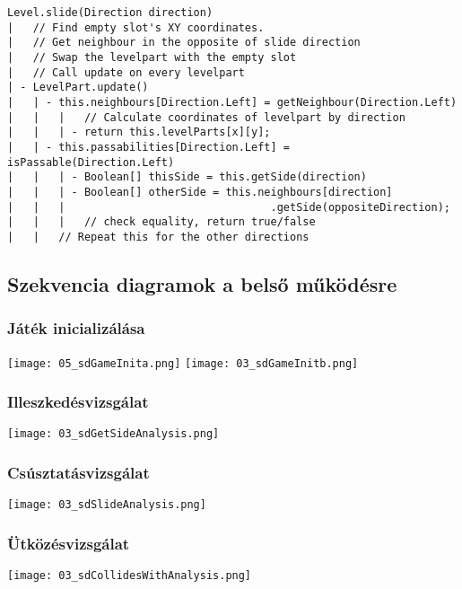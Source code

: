 \begin{verbatim}
Level.slide(Direction direction)
|   // Find empty slot's XY coordinates.
|   // Get neighbour in the opposite of slide direction
|   // Swap the levelpart with the empty slot
|   // Call update on every levelpart
| - LevelPart.update()
|   | - this.neighbours[Direction.Left] = getNeighbour(Direction.Left)
|   |   |   // Calculate coordinates of levelpart by direction
|   |   | - return this.levelParts[x][y];
|   | - this.passabilities[Direction.Left] = isPassable(Direction.Left)
|   |   | - Boolean[] thisSide = this.getSide(direction)
|   |   | - Boolean[] otherSide = this.neighbours[direction]
|   |   |                                .getSide(oppositeDirection);
|   |   |   // check equality, return true/false
|   |   // Repeat this for the other directions
\end{verbatim}

\subsection{Szekvencia diagramok a belső működésre}
	\subsubsection{Játék inicializálása}
		\begin{center}
		\texttt{[image: 05\_sdGameInita.png]}
		\newpage
		\texttt{[image: 03\_sdGameInitb.png]}
		\newpage
		\end{center}
	\subsubsection{Illeszkedésvizsgálat}
		\begin{center}
		\texttt{[image: 03\_sdGetSideAnalysis.png]}
		\newpage
		\end{center}
	\subsubsection{Csúsztatásvizsgálat}
		\begin{center}
		\texttt{[image: 03\_sdSlideAnalysis.png]}
		\newpage
		\end{center}
	\subsubsection{Ütközésvizsgálat}
		\begin{center}
		\texttt{[image: 03\_sdCollidesWithAnalysis.png]}
		\end{center}

